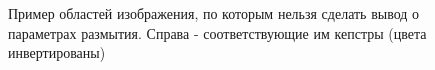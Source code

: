 \begin{figure}[H]
\begin{minipage}[h]{0.4\linewidth}
\end{minipage}
    \vfill
\begin{minipage}[h]{0.4\linewidth}
 \\ 
\end{minipage}
\hfill
\begin{minipage}[h]{0.4\linewidth}
 \\
\end{minipage}

\caption{Пример областей изображения, по которым нельзя сделать вывод о параметрах размытия. Справа - соответствующие им кепстры (цвета инвертированы)}
\label{ris:bad_ceps}
\end{figure}

